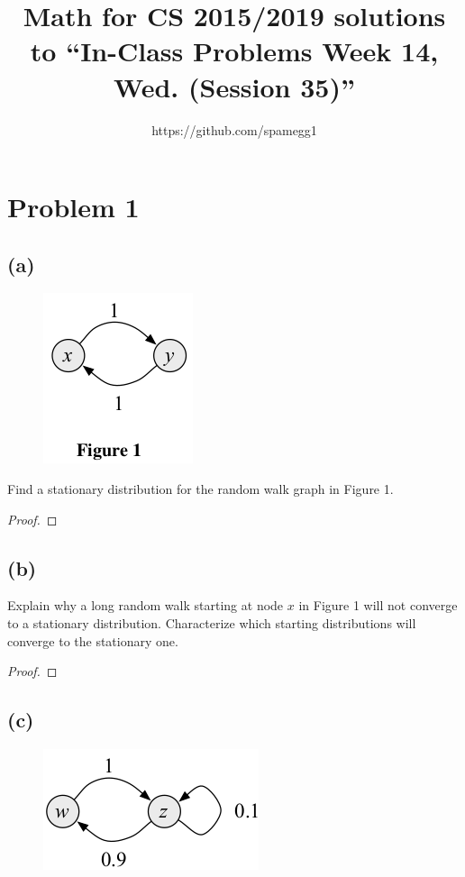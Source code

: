 \documentclass[14pt]{extarticle}
\title{Math for CS 2015/2019 solutions to ``In-Class Problems Week 14, Wed. (Session 35)''}
\author{https://github.com/spamegg1}
\begin{document}
\maketitle
\tableofcontents

\section{Problem 1}
\subsection{(a)}
\begin{figure}[ht!]
\centering
\includegraphics[scale=0.6]{random-walk-1.png}
\end{figure}
Find a stationary distribution for the random walk graph in Figure 1.
\begin{proof}
\end{proof}

\subsection{(b)}
Explain why a long random walk starting at node $x$ in Figure 1 will not converge to a stationary distribution. Characterize which starting distributions will converge to the stationary one.
\begin{proof}
\end{proof}

\subsection{(c)}
\begin{figure}[ht!]
\centering
\includegraphics[scale=0.6]{random-walk-2.png}
\end{figure}
\end{document}
